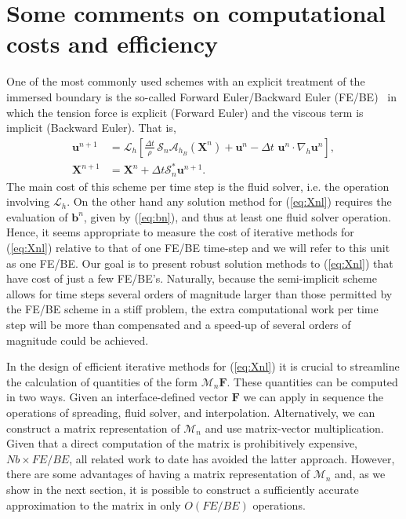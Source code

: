 \documentclass[preprint,12pt]{elsarticle}
\begin{document}
\section{Some comments on computational costs and efficiency} 
\label{Sec:Costs}
One of the most commonly used schemes with an explicit treatment of the immersed boundary is the 
so-called Forward Euler/Backward Euler (FE/BE)~\cite{SW99} in which the tension force is explicit (Forward Euler) and the 
viscous term is implicit (Backward Euler). That is,
\begin{align}
\mathbf{u}^{n+1} &= \mathcal{L}_h \left[\frac{\Delta t}{\rho}\, \mathcal{S}_n\mathcal{A}_{h_B}(\mathbf{X}^{n})+\mathbf{u}^n-\Delta t \, \, \mathbf{u}^n \cdot \nabla_h \mathbf{u}^n\right], \label{eq:FE} \\
\mathbf{X}^{n+1}&=\mathbf{X}^n +\Delta t\mathcal{S}^*_n\mathbf{u}^{n+1}. \label{eq:BE}
\end{align}
The main cost of this scheme per time step is the fluid solver, i.e. the operation involving $\mathcal{L}_h$.  On the other hand
any solution method for (\ref{eq:Xnl}) requires the evaluation of $\mathbf{b}^n$, given by (\ref{eq:bn}), and thus  at
least one fluid solver operation. Hence, it seems appropriate to measure the cost of iterative methods for (\ref{eq:Xnl}) relative to that 
of one FE/BE time-step and we will refer to this unit as one FE/BE. 
Our goal is to present robust solution methods to (\ref{eq:Xnl}) that have cost of just a few FE/BE's. Naturally, 
because the semi-implicit scheme allows for time steps several orders of magnitude larger than those permitted by the FE/BE scheme in a stiff problem,  the extra computational work per time step will be more than compensated and a speed-up of several orders of magnitude could be achieved. 

In the design of efficient iterative methods for (\ref{eq:Xnl}) it is crucial to streamline the calculation of quantities of the form
$\mathcal{M}_n\mathbf{F}$. These quantities can be computed in two ways.  Given an interface-defined vector $\mathbf{F}$
we can apply in sequence the operations of spreading, fluid solver, and interpolation. Alternatively,  we can construct a matrix representation of $\mathcal{M}_n$ and use matrix-vector multiplication.  Given that a direct computation of the matrix
is prohibitively expensive, $Nb \times FE/BE$, all related work to date has avoided the latter approach.  However, 
there are some advantages of having a matrix representation of $\mathcal{M}_n$ and, as we show in the next section,  it is possible to
construct a sufficiently accurate approximation to the matrix in only $O(FE/BE)$ operations.
\end{document}
